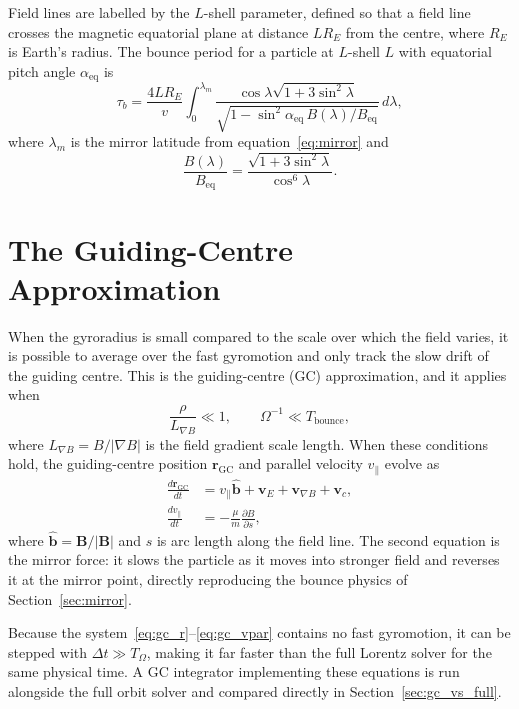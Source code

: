 Field lines are labelled by the $L$-shell parameter, defined so that a
field line crosses the magnetic equatorial plane at distance $LR_E$ from
the centre, where $R_E$ is Earth's radius. The bounce period for a
particle at $L$-shell $L$ with equatorial pitch angle
$\alpha_\mathrm{eq}$ is
\begin{equation}
  \tau_b = \frac{4LR_E}{v} \int_0^{\lambda_m}
    \frac{\cos\lambda\sqrt{1 + 3\sin^2\lambda}}
    {\sqrt{1 - \sin^2\alpha_\mathrm{eq}\,B(\lambda)/B_\mathrm{eq}}}
    \,d\lambda,
  \label{eq:bounce_period}
\end{equation}
where $\lambda_m$ is the mirror latitude from
equation~\eqref{eq:mirror} and
\[
  \frac{B(\lambda)}{B_\mathrm{eq}} =
    \frac{\sqrt{1 + 3\sin^2\lambda}}{\cos^6\lambda}.
\]

\section{The Guiding-Centre Approximation}
\label{sec:gc_theory}

When the gyroradius is small compared to the scale over which the field
varies, it is possible to average over the fast gyromotion and only
track the slow drift of the guiding centre. This is the guiding-centre
(GC) approximation, and it applies when
\begin{equation}
  \frac{\rho}{L_{\nabla B}} \ll 1, \qquad
  \Omega^{-1} \ll T_\mathrm{bounce},
  \label{eq:adiabatic_condition}
\end{equation}
where $L_{\nabla B} = B/|\nabla B|$ is the field gradient scale length.
When these conditions hold, the guiding-centre position
$\mathbf{r}_\mathrm{GC}$ and parallel velocity $v_\parallel$ evolve as
\begin{align}
  \frac{d\mathbf{r}_\mathrm{GC}}{dt} &= v_\parallel \hat{\mathbf{b}}
    + \mathbf{v}_E + \mathbf{v}_{\nabla B} + \mathbf{v}_c,
    \label{eq:gc_r} \\
  \frac{dv_\parallel}{dt} &= -\frac{\mu}{m}\frac{\partial B}{\partial s},
    \label{eq:gc_vpar}
\end{align}
where $\hat{\mathbf{b}} = \mathbf{B}/|\mathbf{B}|$ and $s$ is arc length
along the field line. The second equation is the mirror force: it slows
the particle as it moves into stronger field and reverses it at the
mirror point, directly reproducing the bounce physics of
Section~\ref{sec:mirror}.

Because the system~\eqref{eq:gc_r}--\eqref{eq:gc_vpar} contains no fast
gyromotion, it can be stepped with $\Delta t \gg T_\Omega$, making it far
faster than the full Lorentz solver for the same physical time. A GC
integrator implementing these equations is run alongside the full orbit
solver and compared directly in Section~\ref{sec:gc_vs_full}.
